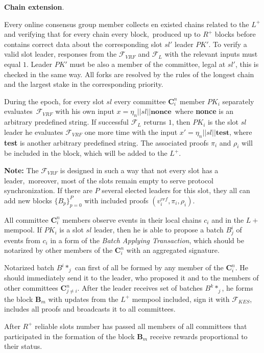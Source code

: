 \begin{legal}
    \item \textbf{Chain extension}.
    \begin{legal}

        \item Every online consensus group member collects en existed chains related to the $L^+$ and verifying that for every chain every block,\
        produced up to $R^+$ blocks before contains correct data about the corresponding slot $sl'$ leader $PK'$.
        To verify a valid slot leader, responses from the ${\mathcal{F}}_{VRF}$ and ${\mathcal{F}}_{L}$ with the relevant inputs must equal $1$. Leader $PK'$ must be also a member of the committee, legal at $sl'$, this is checked in the same way. All forks are resolved by the rules of the longest chain and the largest stake in the corresponding priority.

        \item During the epoch, for every slot $sl$ every committee $\mathbf{C}_i^n$ member $PK_i$ separately evaluates\
        ${\mathcal{F}}_{VRF}$ with his own input ${x = \eta_n || sl || \textbf{nonce}}$\, where \textbf{nonce} is an arbitrary predefined string.
        If successful ${\mathcal{F}}_{L}$ returns $1$, then $PK_i$ is the slot $sl$ leader he evaluates ${\mathcal{F}}_{VRF}$ one more time with the input ${x' = \eta_n || sl || \textbf{test}}$, where \textbf{test} is another arbitrary predefined string.
        The associated proofs $\pi_i$ and $\rho_i$ will be included in the block, which will be added to the $L^+$.

        \textbf{Note:} The ${\mathcal{F}}_{VRF}$ is designed in such a way that not every slot has a leader,\
        moreover, most of the slots remain empty to serve protocol synchronization.
        If there are $P$ several elected leaders for this slot, they all can add new blocks
        $\{B_p\}_{p=0}^P$ with included proofs ${(v_i^{vrf}, \pi_i, \rho_i)}$.

        \item All committee $\mathbf{C}_i^n$ members observe events in their local chains $c_i$ and in the $L+$ mempool.
        If $PK_i$ is a slot $sl$ leader, then he is able to propose a batch $B^i_j$ of events from $c_i$ in a form of the \textit{Batch Applying Transaction}, which should be notarized by other members of the $\mathbf{C}_i^n$ with an aggregated signature.

        \item Notarized batch $B^i*_j$ can first of all be formed by any member of the $\mathbf{C}_i^n$.
        He should immediately send it to the leader, who proposed it and to the members of other committees $\mathbf{C}_{j\neq i}^n$.
        After the leader receives set of batches ${B^k*_j}$, he forms the block $\mathbf{B}_m$ with updates from the $L^+$ mempool included, sign it with ${\mathcal{F}}_{KES}$, includes all proofs and broadcasts it to all committees.

        \item After $R^+$ reliable slots number has passed all members of all committees that participated in the formation of the block $\mathbf{B}_m$ receive rewards proportional to their status.
    \end{legal}
\end{legal}

